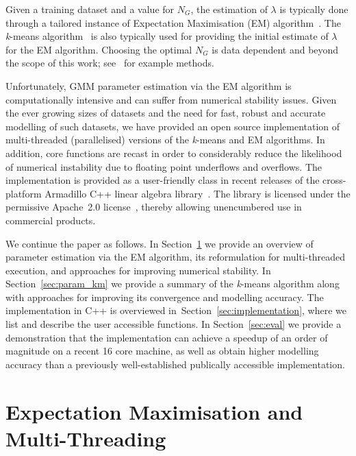 \documentclass[10pt,a4paper]{article}
\begin{document}
Given a training dataset and a value for $N_G$,
the estimation of $\lambda$ is typically done through a
tailored instance of Expectation Maximisation (EM) algorithm~\cite{Dempster77, McLachlan-2008, Moon96, Redner84}.
The {\it k}-means algorithm~\cite{Bishop_2006,Duda01,Linde80} is also typically used for providing the initial estimate of $\lambda$ for the EM algorithm.
Choosing the optimal $N_G$ is data dependent and beyond the scope of this work; see~\cite{Hamerly_2003,Pelleg_2000} for example methods.

Unfortunately, GMM parameter estimation via the EM algorithm is computationally intensive
and can suffer from numerical stability issues.
Given the ever growing sizes of datasets and the need for fast, robust and accurate modelling of such datasets,
we have provided an open source implementation of multi-threaded (parallelised) versions 
of the \mbox{{\it k}-means} and EM algorithms.
In addition, core functions are recast in order to considerably reduce the likelihood of numerical instability due to floating point underflows and overflows.
The implementation is provided as a user-friendly class in recent releases of the cross-platform Armadillo C++ linear algebra library~\cite{Armadillo_JOSS_2016,Armadillo_PASC_2017}.
The library is licensed under the permissive Apache~2.0 license~\cite{Laurent_2008},
thereby allowing unencumbered use in commercial products.

We continue the paper as follows.
In Section~\ref{sec:param_em} we provide an overview of parameter estimation via the EM algorithm,
its reformulation for multi-threaded execution,
and approaches for improving numerical stability.
In Section~\ref{sec:param_km} we provide a summary of the {\it k}-means algorithm
along with approaches for improving its convergence and modelling accuracy.
The implementation in C++ is overviewed in~Section~\ref{sec:implementation},
where we list and describe the user accessible functions.
In Section~\ref{sec:eval}
we provide a demonstration that the implementation can achieve a speedup of an order of magnitude on a recent 16 core machine,
as well as obtain higher modelling accuracy than a previously well-established publically accessible implementation.



\section{Expectation Maximisation and Multi-Threading}
\label{sec:param_em}
\end{document}
